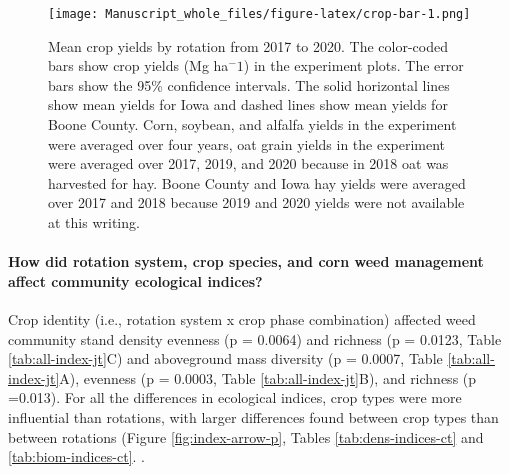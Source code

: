 \documentclass[
]{article}
\begin{document}
\begin{figure}
\centering
\texttt{[image: Manuscript\_whole\_files/figure-latex/crop-bar-1.png]}
\caption{\label{fig:crop-bar}Mean crop yields by rotation from 2017 to 2020. The color-coded bars show crop yields (Mg ha\(^-1\)) in the experiment plots. The error bars show the 95\% confidence intervals. The solid horizontal lines show mean yields for Iowa and dashed lines show mean yields for Boone County. Corn, soybean, and alfalfa yields in the experiment were averaged over four years, oat grain yields in the experiment were averaged over 2017, 2019, and 2020 because in 2018 oat was harvested for hay. Boone County and Iowa hay yields were averaged over 2017 and 2018 because 2019 and 2020 yields were not available at this writing.}
\end{figure}

\hypertarget{how-did-rotation-system-crop-species-and-corn-weed-management-affect-community-ecological-indices}{%
\paragraph*{How did rotation system, crop species, and corn weed management affect community ecological indices?}\label{how-did-rotation-system-crop-species-and-corn-weed-management-affect-community-ecological-indices}}

Crop identity (i.e., rotation system x crop phase combination) affected weed community stand density evenness (p = 0.0064) and richness (p = 0.0123, Table \ref{tab:all-index-jt}C) and aboveground mass diversity (p = 0.0007, Table \ref{tab:all-index-jt}A), evenness (p = 0.0003, Table \ref{tab:all-index-jt}B), and richness (p =0.013). For all the differences in ecological indices, crop types were more influential than rotations, with larger differences found between crop types than between rotations (Figure \ref{fig:index-arrow-p}, Tables \ref{tab:dens-indices-ct} and \ref{tab:biom-indices-ct}. .
\end{document}
